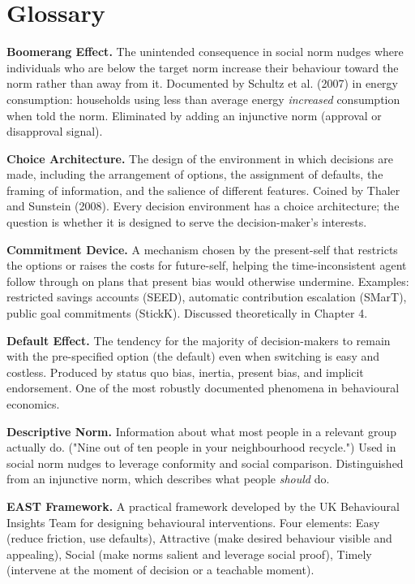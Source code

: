 \documentclass[12pt, letterpaper]{article}
\begin{document}
\newpage


\section*{Glossary}


\textbf{Boomerang Effect.} The unintended consequence in social norm nudges where individuals who are below the target norm increase their behaviour toward the norm rather than away from it. Documented by Schultz et al. (2007) in energy consumption: households using less than average energy \textit{increased} consumption when told the norm. Eliminated by adding an injunctive norm (approval or disapproval signal).

\textbf{Choice Architecture.} The design of the environment in which decisions are made, including the arrangement of options, the assignment of defaults, the framing of information, and the salience of different features. Coined by Thaler and Sunstein (2008). Every decision environment has a choice architecture; the question is whether it is designed to serve the decision-maker's interests.

\textbf{Commitment Device.} A mechanism chosen by the present-self that restricts the options or raises the costs for future-self, helping the time-inconsistent agent follow through on plans that present bias would otherwise undermine. Examples: restricted savings accounts (SEED), automatic contribution escalation (SMarT), public goal commitments (StickK). Discussed theoretically in Chapter 4.

\textbf{Default Effect.} The tendency for the majority of decision-makers to remain with the pre-specified option (the default) even when switching is easy and costless. Produced by status quo bias, inertia, present bias, and implicit endorsement. One of the most robustly documented phenomena in behavioural economics.

\textbf{Descriptive Norm.} Information about what most people in a relevant group actually do. ("Nine out of ten people in your neighbourhood recycle.") Used in social norm nudges to leverage conformity and social comparison. Distinguished from an injunctive norm, which describes what people \textit{should} do.

\textbf{EAST Framework.} A practical framework developed by the UK Behavioural Insights Team for designing behavioural interventions. Four elements: Easy (reduce friction, use defaults), Attractive (make desired behaviour visible and appealing), Social (make norms salient and leverage social proof), Timely (intervene at the moment of decision or a teachable moment).
\end{document}
